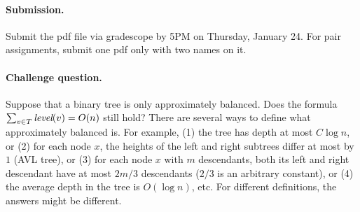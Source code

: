 \documentclass[11pt]{article}
\newcommand{\level}{{\mbox{\it level}}}
\begin{document}
\vskip 0.3in
\paragraph{Submission.}
Submit the pdf file via gradescope by 5PM on Thursday, January 24.
For pair assignments, submit one pdf only with two names on it.

\vskip 0.3in
\paragraph{Challenge question.}
Suppose that a binary tree is only approximately
balanced. Does the formula
$\sum_{v\in T} \level(v) = O(n)$ still hold?
There are several ways to define what approximately
balanced is. For example,
(1) the tree has depth at most $C\log n$,
or
(2) for each node $x$, the heights of the left and right
        subtrees differ at most by $1$ (AVL tree),
or
(3) for each node $x$ with $m$ descendants, both its
        left and right descendant have at most $2m/3$
        descendants ($2/3$ is an arbitrary constant),
or
(4) the average depth in the tree is $O(\log n)$,
etc. For different definitions, the answers might be different.
\end{document}
